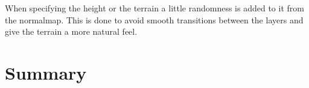 
When specifying the height or the terrain a little randomness is added
to it from the normalmap. This is done to avoid smooth transitions
between the layers and give the terrain a more natural feel.









\section{Summary}









